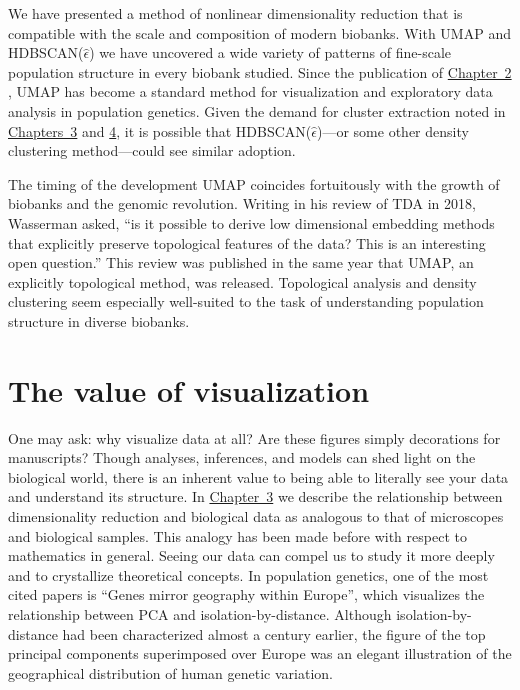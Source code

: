 We have presented a method of nonlinear dimensionality reduction that is compatible with the scale and composition of modern biobanks. With UMAP and HDBSCAN($\hat{\epsilon}$) we have uncovered a wide variety of patterns of fine-scale population structure in every biobank studied. Since the publication of \hyperref[chap:chapter2]{Chapter~2} , UMAP has become a standard method for visualization and exploratory data analysis in population genetics. Given the demand for cluster extraction noted in \hyperref[chap:chapter3]{Chapters~3} and \hyperref[chap:chapter4]{4}, it is possible that HDBSCAN($\hat{\epsilon}$)---or some other density clustering method---could see similar adoption.

The timing of the development UMAP coincides fortuitously with the growth of biobanks and the genomic revolution. Writing in his review of TDA in 2018, Wasserman asked, ``is it possible to derive low dimensional embedding methods that explicitly preserve topological features of the data? This is an interesting open question.''\citep{wasserman_topological_2018} This review was published in the same year that UMAP, an explicitly topological method, was released. Topological analysis and density clustering seem especially well-suited to the task of understanding population structure in diverse biobanks.

\section{The value of visualization}

One may ask: why visualize data at all? Are these figures simply decorations for manuscripts? Though analyses, inferences, and models can shed light on the biological world, there is an inherent value to being able to literally see your data and understand its structure. In \hyperref[chap:chapter3]{Chapter~3} we describe the relationship between dimensionality reduction and biological data as analogous to that of microscopes and biological samples. This analogy has been made before with respect to mathematics in general\citep{cohen_mathematics_2004}. Seeing our data can compel us to study it more deeply and to crystallize theoretical concepts. In population genetics, one of the most cited papers is ``Genes mirror geography within Europe''\citep{novembre2008europe}, which visualizes the relationship between PCA and isolation-by-distance. Although isolation-by-distance had been characterized almost a century earlier, the figure of the top principal components superimposed over Europe was an elegant illustration of the geographical distribution of human genetic variation.

